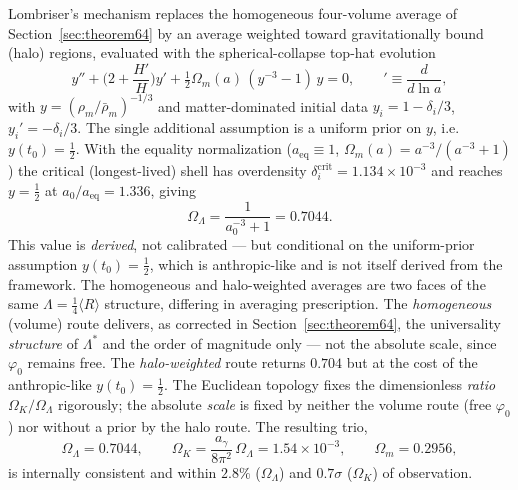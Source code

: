 \documentclass[11pt,a4paper]{article}
\theoremstyle{plain}
\theoremstyle{definition}
\theoremstyle{remark}
\newcommand{\Ok}{\Omega_K}
\newcommand{\OL}{\Omega_\Lambda}
\newcommand{\Om}{\Omega_m}
\newcommand{\ag}{a_\gamma}
\newcommand{\avg}[1]{\langle #1 \rangle}
\begin{document}
Lombriser's mechanism replaces the homogeneous four-volume average of
Section~\ref{sec:theorem64} by an average weighted toward gravitationally bound (halo) regions,
evaluated with the spherical-collapse top-hat evolution
\begin{equation}
\label{eq:tophat}
y'' + \Big(2 + \frac{H'}{H}\Big) y' + \tfrac12 \Om(a)\,(y^{-3} - 1)\,y = 0,
\qquad ' \equiv \frac{d}{d\ln a},
\end{equation}
with $y = (\rho_m/\bar\rho_m)^{-1/3}$ and matter-dominated initial data $y_i = 1-\delta_i/3$,
$y_i' = -\delta_i/3$. The single additional assumption is a uniform prior on $y$, i.e.
$y(t_0) = \tfrac12$. With the equality normalization ($a_{\mathrm{eq}} \equiv 1$,
$\Om(a) = a^{-3}/(a^{-3}+1)$) the critical (longest-lived) shell has overdensity
$\delta_i^{\mathrm{crit}} = 1.134\times 10^{-3}$ and reaches $y = \tfrac12$ at
$a_0/a_{\mathrm{eq}} = 1.336$, giving
\begin{equation}
\label{eq:omlambda}
\OL = \frac{1}{a_0^{-3} + 1} = 0.7044 .
\end{equation}
This value is \emph{derived}, not calibrated --- but conditional on the uniform-prior
assumption $y(t_0) = \tfrac12$, which is anthropic-like and is not itself derived from the
framework. The homogeneous and halo-weighted averages are two faces of the same
$\Lambda = \tfrac14\avg{R}$ structure, differing in averaging prescription. The
\emph{homogeneous} (volume) route delivers, as corrected in
Section~\ref{sec:theorem64}, the universality \emph{structure} of $\Lambda^*$ and the order of
magnitude only --- not the absolute scale, since $\varphi_0$ remains free. The
\emph{halo-weighted} route returns $0.704$ but at the cost of the anthropic-like
$y(t_0)=\tfrac12$. The Euclidean topology fixes the dimensionless \emph{ratio} $\Ok/\OL$
rigorously; the absolute \emph{scale} is fixed by neither the volume route (free $\varphi_0$)
nor without a prior by the halo route. The resulting trio,
\begin{equation}
\OL = 0.7044, \qquad \Ok = \frac{\ag}{8\pi^2}\,\OL = 1.54\times 10^{-3}, \qquad \Om = 0.2956 ,
\end{equation}
is internally consistent and within $2.8\%$ ($\OL$) and $0.7\sigma$ ($\Ok$) of observation.
\end{document}
